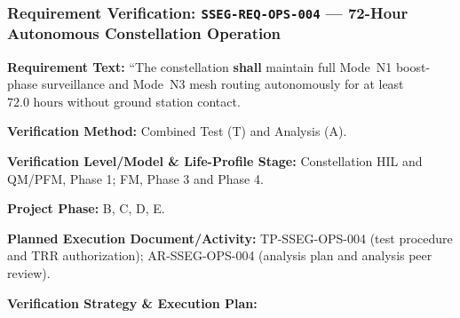 \subsubsection{Requirement Verification: \texttt{SSEG-REQ-OPS-004} --- 72-Hour Autonomous Constellation Operation}
\label{ver:SSEG-REQ-OPS-004}
\textbf{Requirement Text:} ``The  constellation \textbf{shall} maintain full Mode~N1 boost-phase surveillance and Mode~N3  mesh routing autonomously for at least $72.0\text{ hours}$ without ground station contact.
\par\textbf{Verification Method:} Combined Test (T) and Analysis (A).
\par\textbf{Verification Level/Model \& Life-Profile Stage:} Constellation HIL and QM/PFM, Phase 1; FM, Phase 3 and Phase 4.
\par\textbf{Project Phase:} B, C, D, E.
\par\textbf{Planned Execution Document/Activity:} TP-SSEG-OPS-004 (test procedure and TRR authorization); AR-SSEG-OPS-004 (analysis plan and analysis peer review).
\par\textbf{Verification Strategy \& Execution Plan:}
